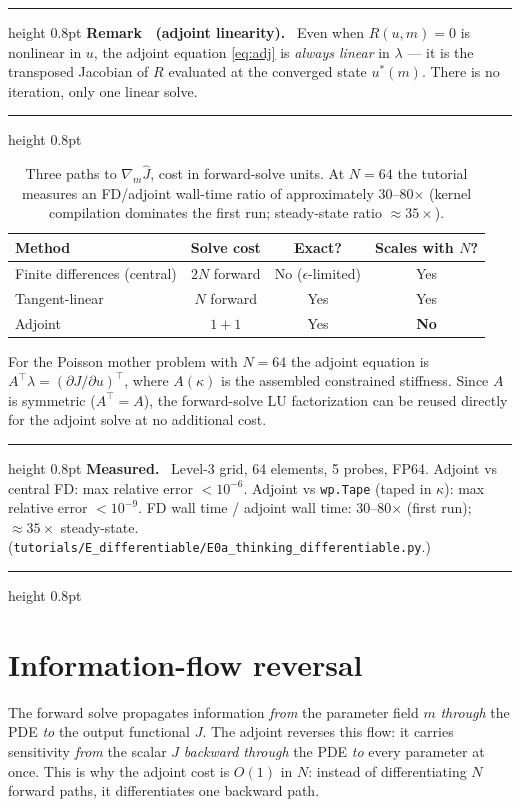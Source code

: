 \documentclass[11pt]{article}
\newcounter{remark}
\newenvironment{remark}[1]{%
  \refstepcounter{remark}\par\medskip
  \noindent\begin{minipage}{\linewidth}
  \hrule height 0.8pt \smallskip
  \textbf{Remark \theremark\ (#1).}\ }{%
  \smallskip\hrule height 0.8pt \end{minipage}\par\medskip}
\newenvironment{measured}{%
  \par\medskip\noindent\begin{minipage}{\linewidth}
  \hrule height 0.8pt \smallskip
  \textbf{Measured.}\ }{%
  \smallskip\hrule height 0.8pt \end{minipage}\par\medskip}
\begin{document}
\begin{remark}{adjoint linearity}
Even when $R(u,m) = 0$ is nonlinear in $u$, the adjoint equation
\eqref{eq:adj} is \emph{always linear} in $\lambda$ --- it is the
transposed Jacobian of $R$ evaluated at the converged state $u^*(m)$.
There is no iteration, only one linear solve.
\end{remark}

\begin{table}[h]
\centering
\caption{Three paths to $\nabla_m \hat{J}$, cost in forward-solve units.
At $N = 64$ the tutorial measures an FD/adjoint wall-time ratio of
approximately 30--80$\times$ (kernel compilation dominates the first run;
steady-state ratio $\approx 35\times$).}
\label{tab:threeways}
\begin{tabular}{lccc}
\toprule
Method & Solve cost & Exact? & Scales with $N$? \\
\midrule
Finite differences (central) & $2N$ forward & No ($\epsilon$-limited) & Yes \\
Tangent-linear                & $N$ forward  & Yes                    & Yes \\
Adjoint                       & $1 + 1$      & Yes                    & \textbf{No} \\
\bottomrule
\end{tabular}
\end{table}

For the Poisson mother problem with $N = 64$ the adjoint equation is
$A^\top \lambda = (\partial J/\partial u)^\top$, where $A(\kappa)$ is
the assembled constrained stiffness.  Since $A$ is symmetric
($A^\top = A$), the forward-solve LU factorization can be reused
directly for the adjoint solve at no additional cost.

\begin{measured}
Level-3 grid, 64 elements, 5 probes, FP64.  Adjoint vs central FD:
max relative error $< 10^{-6}$.  Adjoint vs \texttt{wp.Tape} (taped
in $\kappa$): max relative error $< 10^{-9}$.  FD wall time / adjoint
wall time: 30--80$\times$ (first run); $\approx 35\times$ steady-state.
(\texttt{tutorials/E\_differentiable/E0a\_thinking\_differentiable.py}.)
\end{measured}

\section{Information-flow reversal}
\label{sec:infoflow}

The forward solve propagates information \emph{from} the parameter field
$m$ \emph{through} the PDE \emph{to} the output functional $J$.  The
adjoint reverses this flow: it carries sensitivity \emph{from} the scalar
$J$ \emph{backward through} the PDE \emph{to} every parameter at once.
This is why the adjoint cost is $O(1)$ in $N$: instead of differentiating
$N$ forward paths, it differentiates one backward path.
\end{document}
